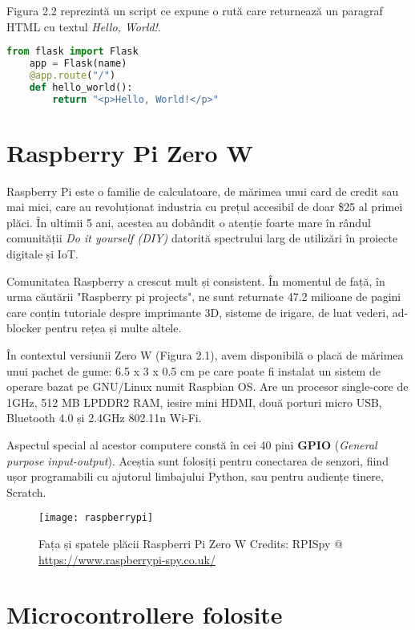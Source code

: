 Figura 2.2 reprezintă un script ce expune o rută care returnează un paragraf HTML cu textul \emph{Hello, World!}.

\begin{lstlisting}[language=Python, caption=Exemplu minimal de aplicație Flask]
	from flask import Flask	
	app = Flask(name)
	@app.route("/")
	def hello_world():
		return "<p>Hello, World!</p>"
\end{lstlisting}
\section{Raspberry Pi Zero W}

Raspberry Pi este o familie de calculatoare, de mărimea unui card de credit sau mai mici, care au revoluționat industria cu prețul accesibil de doar \$25 al primei plăci. În ultimii 5 ani, acestea au dobândit o atenție foarte mare în rândul comunității \emph{Do it yourself (DIY)} datorită spectrului larg de utilizări în proiecte digitale și IoT.

Comunitatea Raspberry a crescut mult și consistent. În momentul de față, în urma căutării "Raspberry pi projects", ne sunt returnate 47.2 milioane de pagini care conțin tutoriale despre imprimante 3D, sisteme de irigare, de luat vederi, ad-blocker pentru rețea și multe altele.

În contextul versiunii Zero W (Figura 2.1), avem disponibilă o placă de mărimea unui pachet de gume: 6.5 x 3 x 0.5 cm pe care poate fi instalat un sistem de operare bazat pe GNU/Linux numit Raspbian OS. Are un procesor single-core de 1GHz, 512 MB LPDDR2 RAM, iesire mini HDMI, două porturi micro USB, Bluetooth 4.0 și 2.4GHz 802.11n Wi-Fi.

Aspectul special al acestor computere constă în cei 40 pini \textbf{GPIO} (\emph{General purpose input-output}). Aceștia sunt folosiți pentru conectarea de senzori, fiind ușor programabili cu ajutorul limbajului Python, sau pentru audiențe tinere, Scratch.


\begin{figure}[h]
	\centering
	\texttt{[image: raspberrypi]}
	\caption{Fața și spatele plăcii Raspberri Pi Zero W
		Credits: RPISpy @ \url{https://www.raspberrypi-spy.co.uk/}}
	\label{fig:raspberrypi}
\end{figure}

\break

\section{Microcontrollere folosite}

